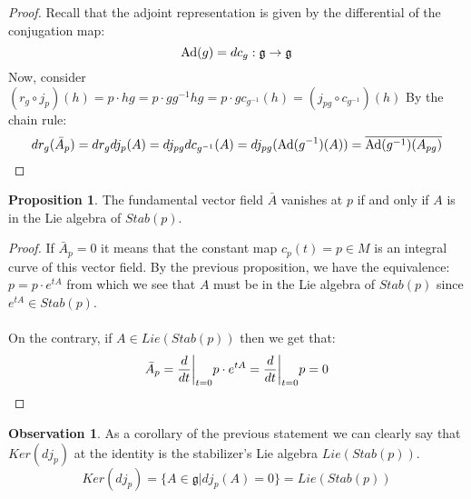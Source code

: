 \documentclass[12pt,a4paper]{report}
\theoremstyle{definition}
\theoremstyle{Theorem}
\newtheorem{Prop}[Def]{Proposition}
\theoremstyle{definition}
\theoremstyle{definition}
\newtheorem{Obs}[Def]{Observation}
\begin{document}
	\begin{proof}
		Recall that the adjoint representation is given by the differential of the conjugation map:
		$$\hbox{Ad}(g)=dc_g:\mathfrak{g}\rightarrow\mathfrak{g}$$
		Now, consider $(r_g\circ j_p)(h)=p\cdot hg=p\cdot gg^{-1}hg=p\cdot g c_{g^{-1}}(h)=(j_{pg}\circ c_{g^{-1}})(h)$
		By the chain rule:
		$$dr_g(\bar{A}_p)=dr_gdj_p(A)=dj_{pg}dc_{g^{-1}}(A)=dj_{pg}(\hbox{Ad}(g^{-1})(A))=\overline{\hbox{Ad}(g^{-1})(A_{pg})}$$
	\end{proof}
	\begin{Prop}
		The fundamental vector field $\bar{A}$ vanishes at $p$ if and only if $A$ is in the Lie algebra of $Stab(p)$.
	\end{Prop}
	\begin{proof}
		If $\bar{A}_p=0$ it means that the constant map $c_p(t)=p\in M$ is an integral curve of this vector field. By the previous proposition, we have the equivalence:
		$p=p\cdot e^{tA}$ from which we see that $A$ must be in the Lie algebra of $Stab(p)$ since $e^{tA}\in Stab(p)$.\\
		\\
		On the contrary, if $A\in Lie( Stab(p))$ then we get that:
		$$\bar{A}_p={d\over dt}\bigg|_{t=0}p\cdot e^{tA}=
		{d\over dt}\bigg|_{t=0}p=0$$
	\end{proof}
	\begin{Obs}\label{Kerdj}
		As a corollary of the previous statement we can clearly say that $Ker(dj_p)$ at the identity is the stabilizer's Lie algebra $Lie(Stab(p))$.
		$$Ker (dj_p)=\{A\in \mathfrak{g}|dj_p(A)=0\}=Lie(Stab(p))$$
	\end{Obs}
\end{document}
